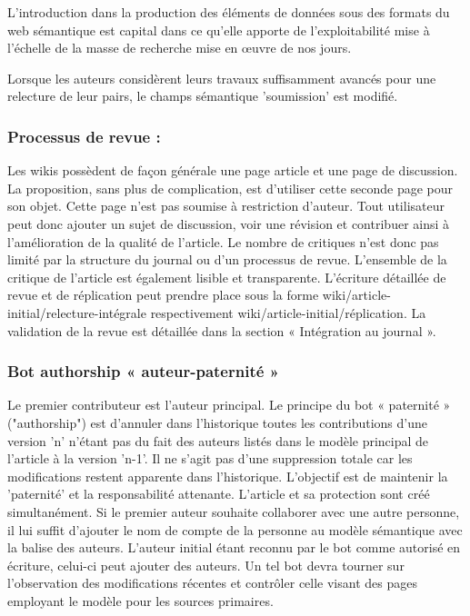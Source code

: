 L'introduction dans la production des éléments de données sous des formats du web sémantique est capital dans ce qu'elle apporte de l'exploitabilité mise à l'échelle de la masse de recherche mise en œuvre de nos jours.

Lorsque les auteurs considèrent leurs travaux suffisamment avancés pour une relecture de leur pairs, le champs sémantique 'soumission' est modifié.

\subsubsection{Processus de revue :}
Les wikis possèdent de façon générale une page article et une page de discussion.
La proposition, sans plus de complication, est d'utiliser cette seconde page pour son objet.
Cette page n'est pas soumise à restriction d'auteur.
Tout utilisateur peut donc ajouter un sujet de discussion, voir une révision et contribuer ainsi à l'amélioration de la qualité de l'article.
Le nombre de critiques n'est donc pas limité par la structure du journal ou d'un processus de revue.
L'ensemble de la critique de l'article est également lisible et transparente.
L'écriture détaillée de revue et de réplication peut prendre place sous la forme wiki/article-initial/relecture-intégrale respectivement wiki/article-initial/réplication.
La validation de la revue est détaillée dans la section « Intégration au journal ».

\subsubsection{Bot authorship « auteur-paternité »}
Le premier contributeur est l'auteur principal.
Le principe du bot « paternité » ("authorship") est d'annuler dans l'historique toutes les contributions d'une version 'n' n'étant pas du fait des auteurs listés dans le modèle principal de l'article à la version 'n-1'.
Il ne s'agit pas d'une suppression totale car les modifications restent apparente dans l'historique.
L'objectif est de maintenir la 'paternité' et la responsabilité attenante.
L'article et sa protection sont créé simultanément.
Si le premier auteur souhaite collaborer avec une autre personne, il lui suffit d'ajouter le nom de compte de la personne au modèle sémantique avec la balise des auteurs.
L'auteur initial étant reconnu par le bot comme autorisé en écriture, celui-ci peut ajouter des auteurs.
Un tel bot devra tourner sur l'observation des modifications récentes et contrôler celle visant des pages employant le modèle pour les sources primaires.

